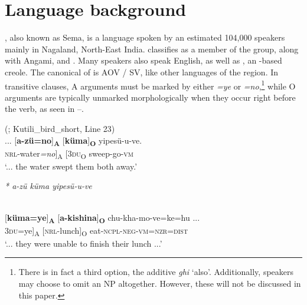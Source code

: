 \documentclass[output=paper]{LSP/langsci}
\begin{document}
\section{Language background}\label{13-te-sec:2}

, also known as Sema, is a  language spoken by an estimated 104,000 speakers \citep{Lewisetal2013Ethnologue} mainly in Nagaland, North-East India. \citet{Burling2003Tibeto} classifies  as a member of the  group, along with Angami,  and . Many  speakers also speak English, as well as , an -based creole. The canonical  of  is AOV / SV, like other  languages of the region. In  transitive clauses, A arguments must be marked by either \textit{=ye} or \textit{=no},\footnote{There is in fact a third option, the additive \textit{ghi} ‘also’. Additionally, speakers may choose to omit an NP altogether. However, these will not be discussed in this paper.} while O arguments are typically unmarked morphologically when they occur right before the verb, as seen in --.


\ea\label{13-te-ex:1}
 (; Kutili\_bird\_short, Line 23){}{\rmfnm}\\

\gll ... [\textbf{a-zü=no}]\textbf{\textsubscript{A}} [\textbf{küma}]\textbf{\textsubscript{O}} yipesü-u-ve.{\rmfnm}\\
{ } \textsc{nrl}-water\textit{=no}]\textsubscript{A} [\textsc{3du}\textsc{\textsubscript{O}}\textsc{\-} sweep-go-\textsc{vm}\\
\glt ‘... the water swept them both away.’
\z
{}

\ea\label{13-te-ex:2}
 \textit{* a-zü küma yipesü-u-ve}
\z

\ea\label{13-te-ex:3}
\\
 [\textbf{{küma=ye}}]\textbf{\textsubscript{A}} [\textbf{{a-kishina}}]\textbf{\textsubscript{O}} {chu-kha-mo-ve=ke=hu} {...}\\
{ } \textsc{3du}={ye}]\textsubscript{A} [\textsc{nrl}-lunch]\textsubscript{O} eat-\textsc{ncpl}-\textsc{neg}-\textsc{vm}=\textsc{nzr}=\textsc{dist}\\
\glt ‘... they were unable to finish their lunch ...’  %
\z
\end{document}
